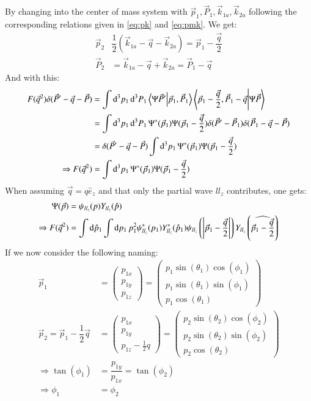 \documentclass{scrartcl}
\begin{document}
By changing into the center of mass system with $\vec{p}_1,\vec{P}_1,\vec{k}_{1a},\vec{k}_{2a}$ following the corresponding relations given in \ref{eq:pk} and \ref{eq:pmk}. We get:
\begin{align}
	\vec{p}_2&\dfrac{1}{2}(\vec{k}_{1a}-\vec{q}-\vec{k}_{2a})=\vec{p}_1-\dfrac{\vec{q}}{2}\\
	\vec{P}_2&=\vec{k}_{1a}-\vec{q}+\vec{k}_{2a}=\vec{P}_1-\vec{q}
\end{align}
And with this:
\begin{align}
	F(\vec{q}^2)\delta(\vec{P}'-\vec{q}-\vec{P})&=\int\dd[3]{p_1}\dd[3]{P_1}\bra{\Psi \vec{P}'}\ket{\vec{p}_1,\vec{P}_1}\bra{\vec{p}_1-\dfrac{\vec{q}}{2},\vec{P}_1-\vec{q}}\ket{\Psi\vec{P}}\\
	&=\int\dd[3]{p_1}\dd[3]{P_1}\Psi^*(\vec{p}_1)\Psi(\vec{p}_1-\dfrac{\vec{q}}{2})\delta(\vec{P}'-\vec{P}_1)\delta(\vec{P}_1-\vec{q}-\vec{P})\\
	&=\delta(\vec{P}'-\vec{q}-\vec{P})\int\dd[3]{p_1}\Psi^*(\vec{p}_1)\Psi(\vec{p}_1-\dfrac{\vec{q}}{2})\\
	\Rightarrow F(\vec{q}^2)&=\int\dd[3]{p_1}\Psi^*(\vec{p}_1)\Psi(\vec{p}_1-\dfrac{\vec{q}}{2})\label{eq:F1}
\end{align}
When assuming $\vec{q}=q \hat{e}_z$ and that only the partial wave $ll_z$ contributes, one gets:
\begin{align}
	\Psi(\vec{p})&=\psi_{ll_z}(p) Y_{ll_z}(\hat{p})\\
	\Rightarrow F(\vec{q}^2)&= \int \dd{\hat{p}_1}\int\dd{p_1} p_1^2\psi_{ll_z}^*(p_1) Y_{ll_z}^*(\hat{p}_1)\psi_{ll_z}\left(\abs{\vec{p}_1-\frac{\vec{q}}{2}}\right) Y_{ll_z}\left(\widehat{\vec{p}_1-\frac{\vec{q}}{2}}\right)\label{eq:F2}
\end{align}
If we now consider the following naming:
\begin{align}
	\vec{p}_1&=\left(\begin{array}{c}
	p_{1x}\\
	p_{1y}\\
	p_{1z}
	\end{array}\right)=\left(\begin{array}{c}
	p_{1}\sin(\theta_1)\cos(\phi_1)\\
	p_{1}\sin(\theta_1)\sin(\phi_1)\\
	p_{1}\cos(\theta_1)
	\end{array}\right)\\
	\vec{p}_2=\vec{p}_1-\dfrac{1}{2}\vec{q}&=\left(\begin{array}{c}
	p_{1x}\\
	p_{1y}\\
	p_{1z}-\frac{1}{2}q
	\end{array}\right)=\left(\begin{array}{c}
	p_{2}\sin(\theta_2)\cos(\phi_2)\\
	p_{2}\sin(\theta_2)\sin(\phi_2)\\
	p_{2}\cos(\theta_2)
	\end{array}\right)\\
	\Rightarrow \tan(\phi_1)&=\dfrac{p_{1y}}{p_{1x}}=\tan(\phi_2)\\
	\Rightarrow \phi_1&=\phi_2\label{eq:phi1phi2}
\end{align}
\end{document}
